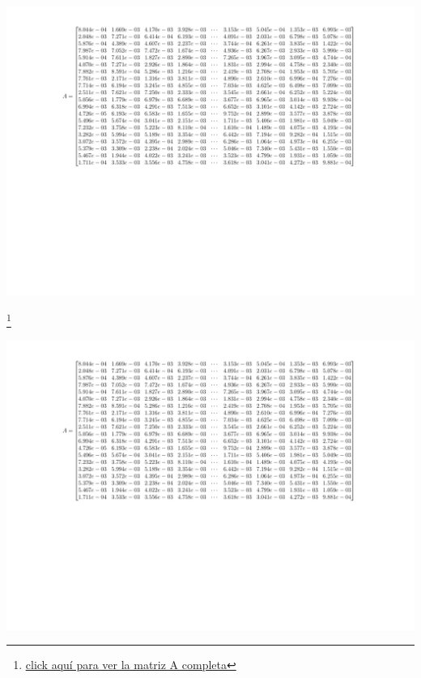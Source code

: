 \documentclass[10pt,a4paper]{article}
\begin{document}
\newpage
\begin{center}
	
	\includegraphics[page=1, trim= 4cm 8.9cm 4cm 1cm ,clip,scale=0.8]{matrix}
\end{center}
\footnote{\href{https://drive.google.com/drive/folders/1IG3zhcmc9r95b-fswaWiVBEHy0orYTWj?usp=sharing}{\underline{click aquí para ver la matriz A completa}}}
\vspace{-1.5cm}
\begin{center}
	\includegraphics[page=2, trim= 4cm 8cm 4cm 1cm ,clip,scale=0.8]{matrix}
\end{center}
\vspace{-1.5cm}
\end{document}
